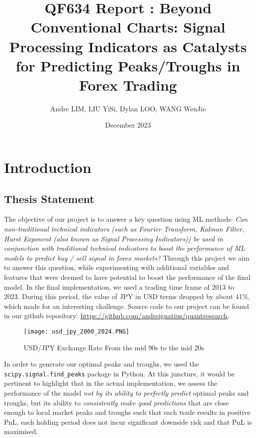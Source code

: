 \documentclass{article}
\title{QF634 Report : Beyond Conventional Charts: Signal Processing Indicators as Catalysts for Predicting Peaks/Troughs in Forex Trading}
\author{Andre LIM, LIU YiSi, Dylan LOO, WANG WenJie}
\date{December 2023}
\begin{document}
\maketitle

\section{Introduction}

\subsection{Thesis Statement}
The objective of our project is to answer a key question using ML methods: \textit{Can non-traditional technical indicators (such as Fourier Transform, Kalman Filter, Hurst Exponent (also known as Signal Processing Indicators)) be used in conjunction with traditional technical indicators to boost the performance of ML models to predict buy / sell signal in forex markets?} Through this project we aim to answer this question, while experimenting with additional variables and features that were deemed to have potential to boost the performance of the final model.
\newline
\newline
\noindent In the final implementation, we used a trading time frame of 2013 to 2023. During this period, the value of JPY in USD terms dropped by about 41\%, which made for an interesting challenge. Source code to our project can be found in our github repository: \href{https://github.com/andreignatius/quantresearch}{https://github.com/andreignatius/quantresearch}.

\begin{figure}[h]
  \centering
  \texttt{[image: usd\_jpy\_2000\_2024.PNG]}
  \caption{USD/JPY Exchange Rate From the mid 90s to the mid 20s}
\end{figure}

\noindent In order to generate our optimal peaks and troughs, we used the  \texttt{scipy.signal.find\_peaks} package in Python. At this juncture, it would be pertinent to highlight that in the actual implementation, we assess the performance of the model \textit{not by its ability to perfectly predict} optimal peaks and troughs, but its ability to \textit{consistently make good predictions} that are close enough to local market peaks and troughs such that each trade results in positive PnL,  each holding period does not incur significant downside risk and that PnL is maximised.
\newline
\end{document}
